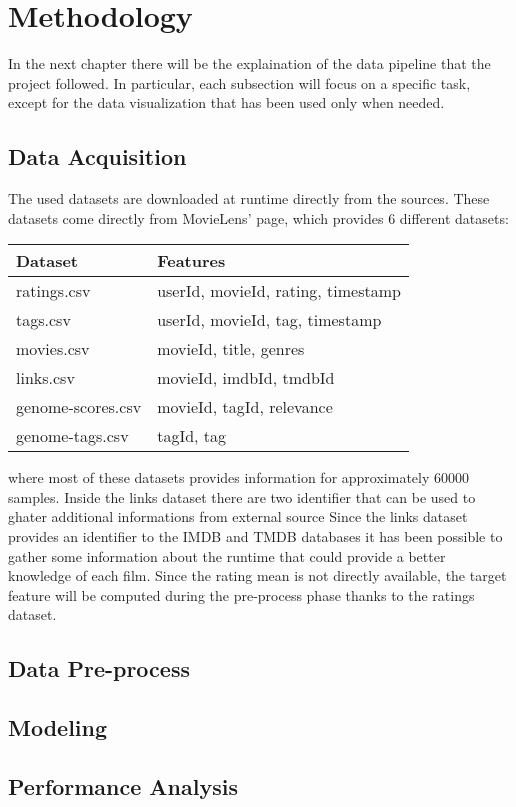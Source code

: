 \documentclass[../main]{subfiles}
\begin{document}
\chapter{Methodology}
In the next chapter there will be the explaination of the data pipeline that the project followed.
In particular, each subsection will focus on a specific task, except for the data visualization that has been used only when needed.

\section{Data Acquisition}
The used datasets are downloaded at runtime directly from the sources.
These datasets come directly from MovieLens' page, which provides 6 different datasets:
\begin{table}[h]
    \begin{tabular}{|l | l|}
    \hline
    \textbf{Dataset} & \textbf{Features} \\
    \hline
    ratings.csv &  userId, movieId, rating, timestamp\\
    \hline
    tags.csv &  userId, movieId, tag, timestamp\\
    \hline
    movies.csv &  movieId, title, genres\\
    \hline
    links.csv &  movieId, imdbId, tmdbId\\
    \hline
    genome-scores.csv &  movieId, tagId, relevance\\
    \hline
    genome-tags.csv & tagId, tag\\
    \hline
    \end{tabular}
\end{table}

where most of these datasets provides information for approximately 60000 samples.
Inside the links dataset there are two identifier that can be used to ghater additional informations from external source
Since the links dataset provides an identifier to the IMDB and TMDB databases it has been possible to gather some information about the runtime that could provide a better knowledge of each film.
Since the rating mean is not directly available, the target feature will be computed during the pre-process phase thanks to the ratings dataset.


\section{Data Pre-process}
\section{Modeling}
\section{Performance Analysis}
\end{document}
